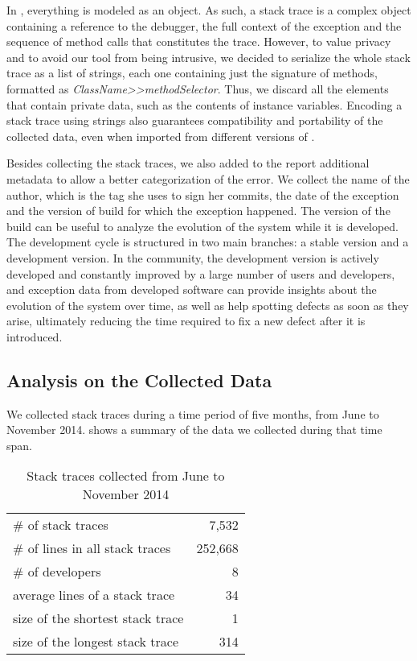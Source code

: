 In \pha, everything is modeled as an object.
As such, a stack trace is a complex object containing a reference to the debugger, the full context of the exception and the sequence of method calls that constitutes the trace.
However, to value privacy and to avoid our tool from being intrusive, we decided to serialize the whole stack trace as a list of strings, each one containing just the signature of methods, formatted as \textit{ClassName{>}{>}methodSelector}.
Thus, we discard all the elements that contain private data, such as the contents of instance variables.
Encoding a stack trace using strings also guarantees compatibility and portability of the collected data, even when imported from different versions of \pha.

Besides collecting the stack traces, we also added to the report additional metadata to allow a better categorization of the error.
We collect the name of the author, which is the tag she uses to sign her commits, the date of the exception and the version of \pha build for which the exception happened.
The version of the build can be useful to analyze the evolution of the system while it is developed.
The \pha development cycle is structured in two main branches: a stable version and a development version.
In the \pha community, the development version is actively developed and constantly improved by a large number of users and developers, and exception data from developed software can provide insights about the evolution of the system over time, as well as help spotting defects as soon as they arise, ultimately reducing the time required to fix a new defect after it is introduced.

\subsection{Analysis on the Collected Data}

We collected stack traces during a time period of five months, from June to November 2014.
 shows a summary of the data we collected during that time span.

\begin{table}[ht]
\caption{Stack traces collected from June to November 2014}
\begin{center}
\begin{tabular}{lr}
\# of stack traces & 7,532 \\
\# of lines in all stack traces & 252,668 \\
\# of developers & 8 \\
average lines of a stack trace & 34 \\
size of the shortest stack trace & 1 \\
size of the longest stack trace & 314 \\
\end{tabular}
\end{center}
\label{tab:data-summary}
\end{table}

